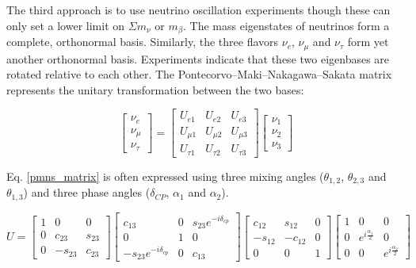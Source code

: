 
The third approach is to use neutrino oscillation experiments though these can only set a lower limit on $\Sigma m_\nu$ or $m_\beta$. The mass eigenstates of neutrinos form a complete, orthonormal basis. Similarly, the three flavors $\nu_e$, $\nu_\mu$ and $\nu_\tau$ form yet another orthonormal basis. Experiments indicate that these two eigenbases are rotated relative to each other. The Pontecorvo–Maki–Nakagawa–Sakata matrix represents the unitary transformation between the two bases:

\begin{equation}\label{pmns_matrix}
\begin{bmatrix} \nu_e \\ \nu_\mu \\ \nu_\tau \end{bmatrix} = \begin{bmatrix} U_{e1} & U_{e2} & U_{e3}\\ U_{\mu 1} & U_{\mu 2} & U_{\mu 3} \\ U_{\tau 1} & U_{\tau 2} & U_{\tau 3} \end{bmatrix} \begin{bmatrix} \nu_1 \\ \nu_2 \\ \nu_3 \end{bmatrix}
\end{equation}

Eq. \ref{pmns_matrix} is often expressed using three mixing angles ($\theta_{1,2}$, $\theta_{2,3}$ and $\theta_{1,3}$) and three phase angles ($\delta_{CP}$, $\alpha_1$ and $\alpha_2$).

\begin{equation}\label{pmns_matrix_expanded}
U = \begin{bmatrix} 1 & 0 & 0\\ 0 & c_{23} & s_{23} \\ 0 & -s_{23} & c_{23} \end{bmatrix} \begin{bmatrix} c_{13} & 0 & s_{23}e^{-i\delta_{cp}}\\ 0 & 1 & 0 \\ -s_{23}e^{-i\delta_{cp}} & 0 & c_{13} \end{bmatrix} \begin{bmatrix} c_{12} & s_{12} & 0\\ -s_{12} & -c_{12} & 0 \\ 0 & 0 & 1 \end{bmatrix} \begin{bmatrix} 1 & 0 & 0\\ 0 & e^{i\frac{\alpha_1}{2}} & 0 \\ 0 & 0 & e^{i\frac{\alpha_2}{2}}\end{bmatrix}
\end{equation}

